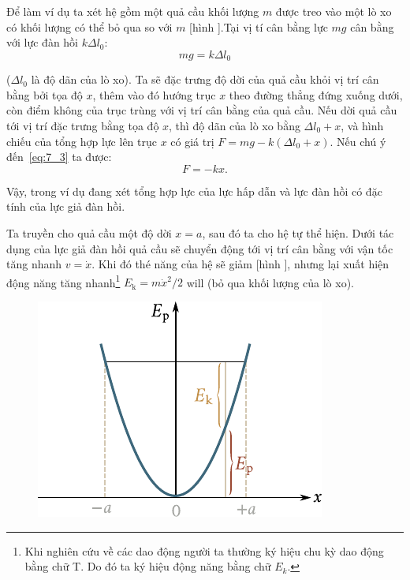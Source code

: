Để làm ví dụ ta xét hệ gồm một quả cầu khối lượng $m$ được treo vào một lò xo có khối lượng có thể bỏ qua so với $m$ [hình ].Tại vị tí cân bằng lực $mg$ cân bằng với lực đàn hồi $k\Delta l_0$:
\begin{equation}\label{eq:7_3}
	mg = k\Delta l_0
\end{equation}

\noindent
($\Delta l_0$ là độ dãn của lò xo). Ta sẽ đặc trưng độ dời của quả cầu khỏi vị trí cân bằng bởi tọa độ $x$, thêm vào đó hướng trục $x$ theo đường thẳng đứng xuống dưới, còn điểm không của trục trùng với vị trí cân bằng của quả cầu. Nếu dời quả cầu tới vị trí đặc trưng bằng tọa độ $x$, thì độ dãn của lò xo bằng $\Delta l_0+x$, và hình chiếu của tổng hợp lực lên trục $x$ có giá trị $F=mg-k(\Delta l_0+x)$. Nếu chú ý đến~\eqref{eq:7_3} ta được:
\begin{equation}\label{eq:7_4}
	F = -kx.
\end{equation}

\noindent
Vậy, trong ví dụ đang xét tổng hợp lực của lực hấp dẫn và lực đàn hồi có đặc tính của lực giả đàn hồi.

Ta truyền cho quả cầu một độ dời $x=a$, sau đó ta cho hệ tự thể hiện. Dưới tác dụng của lực giả đàn hồi quả cầu sẽ chuyển động tới vị trí cân bằng với vận tốc tăng nhanh $v=\dot{x}$. Khi đó thé năng của hệ sẽ giảm [hình ], nhưng lại xuất hiện động năng tăng nhanh\footnote{Khi nghiên cứu về các dao động người ta thường ký hiệu chu kỳ dao động bằng chữ T. Do đó ta ký hiệu động năng bằng chữ $E_k$.} $E_{\text{k}}=m\dot{x}^2/2$ will (bỏ qua khối lượng của lò xo).

\begin{figure}[!htb]
	\begin{center}
		\includegraphics[scale=0.95]{figures/ch_07/fig_7_2.pdf}
		\caption[]{}
		\label{fig:7_2}
	\end{center}
\end{figure}

